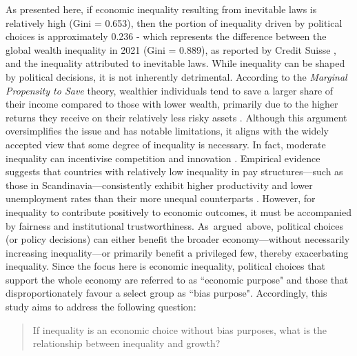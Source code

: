As presented here, if economic inequality resulting from inevitable laws is relatively high (Gini = 0.653), then the portion of inequality driven by political choices is approximately 0.236 - which represents the difference between the global wealth inequality in 2021 (Gini = 0.889), as reported by Credit Suisse \parencite{suisse2022global}, and the inequality attributed to inevitable laws. While inequality can be shaped by political decisions, it is not inherently detrimental.  According to the \textit{Marginal Propensity to Save} theory, wealthier individuals tend to save a larger share of their income compared to those with lower wealth, primarily due to the higher returns they receive on their relatively less risky assets \parencite{fagereng2020heterogeneity}. Although this argument oversimplifies the issue and has notable limitations, it aligns with the widely accepted view that some degree of inequality is necessary. In fact, moderate inequality can incentivise competition and innovation \parencite{balietti2021incentives}. Empirical evidence suggests that countries with relatively low inequality in pay structures—such as those in Scandinavia—consistently exhibit higher productivity and lower unemployment rates than their more unequal counterparts \parencite{galbraith2016inequality}. However, for inequality to contribute positively to economic outcomes, it must be accompanied by fairness and institutional trustworthiness.  As argued above, political choices (or policy decisions) can either benefit the broader economy—without necessarily increasing inequality—or primarily benefit a privileged few, thereby exacerbating inequality. Since the focus here is economic inequality, political choices that support the whole economy are referred to as ``economic purpose" and those that disproportionately favour a select group as ``bias purpose". Accordingly, this study aims to address the following question:  
\begin{quote}
If inequality is an economic choice without bias purposes, what is the relationship between inequality and growth?
\end{quote}

